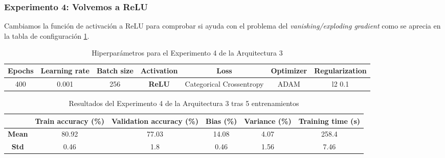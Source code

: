 \documentclass{article}
\begin{document}
		\subsubsection{Experimento 4: Volvemos a ReLU}
		\label{d-s-a3-e4}
			Cambiamos la funci\'on de activaci\'on a ReLU para comprobar si ayuda con el problema del \textit{vanishing/exploding gradient} como se aprecia en la tabla de configuraci\'on \ref{tab:hip-d-a3-e4}.
			\begin{table}[!h]
				\begin{tabular}{| c | c | c | c | c | c | c |}
					\textbf{Epochs} & \textbf{Learning rate} & \textbf{Batch size} & \textbf{Activation} & \textbf{Loss} & \textbf{Optimizer} & \textbf{Regularization} \\ \hline
					400 & 0.001 & 256 & \textbf{ReLU} & Categorical Crossentropy & ADAM & l2 0.1
				\end{tabular}
				\caption{Hiperpar\'ametros para el Experimento 4 de la Arquitectura 3}
				\label{tab:hip-d-a3-e4}
			\end{table}
			\newpage
			\begin{table}[!h]
				\begin{center}
					\begin{tabular}{ c | c | c | c | c | c |}
						\ & \textbf{Train accuracy (\%)} & \textbf{Validation accuracy (\%)} & \textbf{Bias (\%)} & \textbf{Variance (\%)} & \textbf{Training time (s)} \\ \hline
						\textbf{Mean} & 80.92 & 77.03 & 14.08 & 4.07 & 258.4 \\ \hline
						\textbf{Std} & 0.46 & 1.8 & 0.46 & 1.56 & 7.46 \\ \hline
					\end{tabular}
					\caption{Resultados del Experimento 4 de la Arquitectura 3 tras 5 entrenamientos}
					\label{tab:res-d-a3-e4}
				\end{center}
			\end{table}
			
\end{document}
